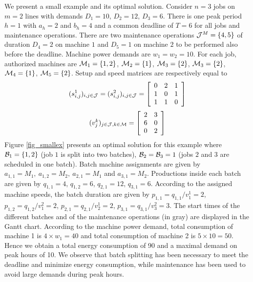 We present a small example and its optimal solution. Consider $n=3$
jobs on $m=2$ lines with demands $D_1=10$, $D_2=12$, $D_3=6$. There is
one peak period $h=1$ with $a_h=2$ and $b_h=4$ and a common deadline
of $T=6$ for all jobs and maintenance operations. There are two
maintenance operations ${\cal J}^M=\{4,5\}$ of duration $D_4=2$ on
machine $1$ and $D_5=1$ on machine $2$ to be performed also before the
deadline. Machine power demands are $w_1=w_2=10$.  For each job,
authorized machines are ${\cal M}_1=\{1,2\}$, ${\cal M}_2=\{1\}$,
${\cal M}_3=\{2\}$, ${\cal M}_3=\{2\}$, ${\cal M}_4=\{1\}$, ${\cal
  M}_5=\{2\}$.  Setup and speed matrices are respectively equal to
$$(s_{i,j}^1)_{i,j\in{\cal J}}=(s_{i,j}^2)_{i,j\in{\cal
    J}}=\left[\begin{array}{ccc}0&2&1\\1 & 0 &
    1\\1&1&0\end{array}\right]$$
$$(v_j^k)_{j\in{\cal J},k\in{\cal
    M}}=\left[\begin{array}{cc}2&3\\6&0\\0&2\end{array}\right]$$
Figure \ref{fig_smallex} presents an optimal solution for this example
where ${\cal B}_1=\{1,2\}$ (job $1$ is split into two batches), ${\cal
  B}_2={\cal B}_3=1$ (jobs $2$ and $3$ are scheduled in one batch).
Batch machine assignments are given by $a_{1,1}=M_1,\ a_{1,2}=M_2,\
a_{2,1}=M_1$ and $a_{3,1}=M_2$. Productions
inside each batch are given by $q_{1,1}=4$, $q_{1,2}=6$, $q_{2,1}=12$,
$q_{3,1}=6$. According to the assigned machine speeds, the batch
duration are given by $p_{1,1}=q_{1,1}/v_1^1=2$,
$p_{1,2}=q_{1,2}/v_1^2=2$, $p_{2,1}=q_{2,1}/v_2^1=2$,
$p_{3,1}=q_{3,1}/v_3^2=3$. The start times of the different batches
and of the maintenance operations (in gray) are displayed in the Gantt
chart. According to the machine power demand, total consumption of
machine 1 is $4\times w_1=40$ and total consumption of machine 2 is
$5\times 10=50$. Hence we obtain a total energy consumption of 90 and
a maximal demand on peak hours of 10. We observe that batch splitting
has been necessary to meet the deadline and minimize energy
consumption, while maintenance has been used to avoid large demands
during peak hours.
